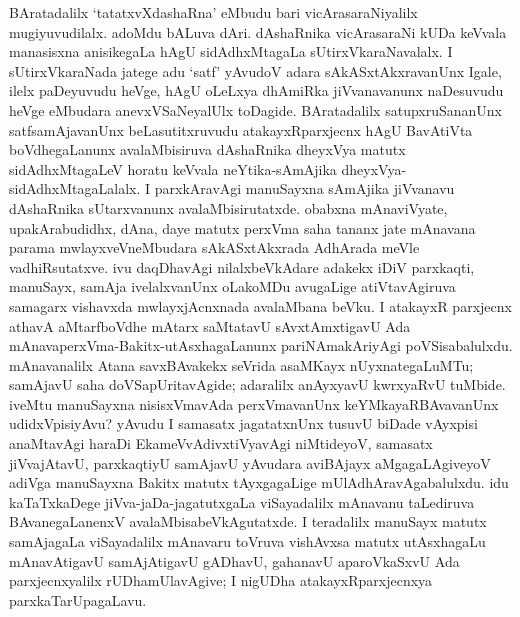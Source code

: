 BAratadalilx `tatatxvXdashaRna' eMbudu bari vicArasaraNiyalilx mugiyuvudilalx. adoMdu bALuva dAri. dAshaRnika vicArasaraNi kUDa keVvala manasisxna anisikegaLa hAgU sidAdhxMtagaLa sUtirxVkaraNavalalx. I sUtirxVkaraNada jatege adu `satf' yAvudoV adara sAkASxtAkxravanUnx Igale, ilelx paDeyuvudu heVge, hAgU oLeLxya dhAmiRka jiVvanavanunx naDesuvudu heVge eMbudara anevxVSaNeyalUlx toDagide. BAratadalilx satupxruSananUnx satfsamAjavanUnx beLasutitxruvudu atakayxRparxjecnx hAgU BavAtiVta boVdhegaLanunx avalaMbisiruva dAshaRnika dheyxVya matutx sidAdhxMtagaLeV horatu keVvala neYtika-sAmAjika dheyxVya-sidAdhxMtagaLalalx. I parxkAravAgi manuSayxna sAmAjika jiVvanavu dAshaRnika sUtarxvanunx avalaMbisirutatxde. obabxna mAnaviVyate, upakArabudidhx, dAna, daye matutx perxVma saha tananx jate mAnavana parama mwlayxveVneMbudara sAkASxtAkxrada AdhArada meVle vadhiRsutatxve. ivu daqDhavAgi nilalxbeVkAdare adakekx iDiV parxkaqti, manuSayx, samAja ivelalxvanUnx oLakoMDu avugaLige atiVtavAgiruva samagarx vishavxda mwlayxjAcnxnada avalaMbana beVku. I atakayxR parxjecnx athavA aMtarfboVdhe mAtarx saMtatavU sAvxtAmxtigavU Ada mAnavaperxVma-Bakitx-utAsxhagaLanunx pariNAmakAriyAgi poVSisabalulxdu. mAnavanalilx Atana savxBAvakekx seVrida asaMKayx nUyxnategaLuMTu; samAjavU saha doVSapUritavAgide; adaralilx anAyxyavU kwrxyaRvU tuMbide. iveMtu manuSayxna nisisxVmavAda perxVmavanUnx keYMkayaRBAvavanUnx udidxVpisiyAvu? yAvudu I samasatx jagatatxnUnx tusuvU biDade vAyxpisi anaMtavAgi haraDi EkameVvAdivxtiVyavAgi niMtideyoV, samasatx jiVvajAtavU, parxkaqtiyU samAjavU yAvudara aviBAjayx aMgagaLAgiveyoV adiVga manuSayxna Bakitx matutx tAyxgagaLige mUlAdhAravAgabalulxdu. idu kaTaTxkaDege jiVva-jaDa-jagatutxgaLa viSayadalilx mAnavanu taLediruva BAvanegaLanenxV avalaMbisabeVkAgutatxde. I teradalilx manuSayx matutx samAjagaLa viSayadalilx mAnavaru toVruva vishAvxsa matutx utAsxhagaLu mAnavAtigavU samAjAtigavU gADhavU, gahanavU aparoVkaSxvU Ada parxjecnxyalilx rUDhamUlavAgive; I nigUDha atakayxRparxjecnxya parxkaTarUpagaLavu.

